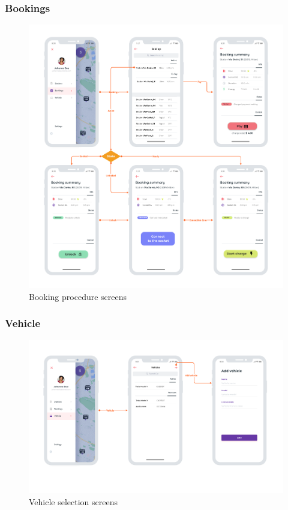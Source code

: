 \subsubsection{Bookings}
\begin{center}
    \begin{figure}[H]
        \includegraphics[width=\textwidth]{./img/design/app/Bookings.png}
        \caption{Booking procedure screens}
    \end{figure}
\end{center}

\subsubsection{Vehicle}
\begin{center}
    \begin{figure}[H]
        \includegraphics[width=\textwidth]{./img/design/app/Vehicles.png}
        \caption{Vehicle selection screens}
    \end{figure}
\end{center}

